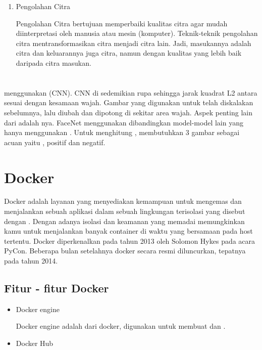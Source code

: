 {{\begin{enumerate}
  \item Pengolahan Citra
    
  Pengolahan Citra bertujuan memperbaiki kualitas citra agar
  mudah diinterpretasi oleh manusia atau mesin (komputer).
  Teknik-teknik pengolahan citra mentransformasikan citra menjadi citra lain. Jadi, masukannya adalah citra dan keluarannya
  juga citra, namun dengan kualitas yang lebih baik daripada
  citra masukan.
\end{enumerate}

\section{}
 menggunakan (CNN). CNN di  sedemikian rupa sehingga jarak kuadrat L2 antara  sesuai dengan kesamaan wajah.
Gambar yang digunakan untuk  telah diskalakan sebelumnya, lalu diubah dan dipotong di sekitar area wajah.
Aspek penting lain dari  adalah nya. FaceNet menggunakan  dibandingkan model-model lain yang hanya menggunakan .
Untuk menghitung , membutuhkan 3 gambar sebagai acuan yaitu , positif dan negatif\citep{Facenet2015}.

\section{Docker}
Docker adalah layanan yang menyediakan kemampuan untuk mengemas dan menjalankan sebuah aplikasi dalam sebuah lingkungan terisolasi yang disebut dengan .
Dengan adanya isolasi dan keamanan yang memadai memungkinkan kamu untuk menjalankan banyak container di waktu yang bersamaan pada host tertentu.
Docker diperkenalkan pada tahun 2013 oleh Solomon Hykes pada acara PyCon. Beberapa bulan setelahnya docker secara resmi diluncurkan, tepatnya pada tahun 2014.
\subsection{Fitur - fitur Docker}
\begin{itemize}
  \item Docker engine
  
  Docker engine adalah  dari docker, digunakan untuk membuat  dan .

  \item Docker Hub
  

\end{itemize}}}
